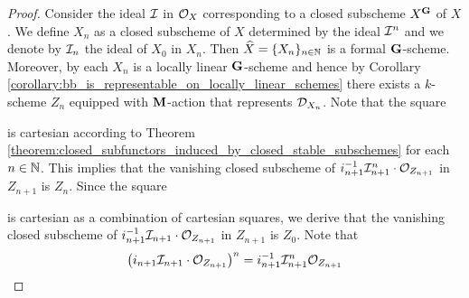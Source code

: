 \begin{proof}
Consider the ideal ${\mathcal I}$ in ${\mathcal O}_X$ corresponding to a closed subscheme $X^{\mathbf{G}}$ of $X$. We define $X_n$ as a closed subscheme of $X$ determined by the ideal ${\mathcal I}^n$ and we denote by ${\mathcal I}_{n}$ the ideal of $X_0$ in $X_n$. Then $\widehat{X} = \{X_n\}_{n\in {\mathbb N}}$ is a formal $\mathbf{G}$-scheme. Moreover, by {\cite[Corollary 5.1]{Algebraization}} each $X_n$ is a locally linear $\mathbf{G}$-scheme and hence by Corollary \ref{corollary:bb_is_representable_on_locally_linear_schemes} there exists a $k$-scheme $Z_n$ equipped with $\mathbf{M}$-action that represents ${\mathcal D}_{X_n}$. Note that the square
\begin{center}
\end{center}
is cartesian according to Theorem \ref{theorem:closed_subfunctors_induced_by_closed_stable_subschemes} for each $n\in {\mathbb N}$. This implies that the vanishing closed subscheme of $i_{n+1}^{-1}{\mathcal I}^n_{n+1}\cdot {\mathcal O}_{Z_{n+1}}$ in $Z_{n+1}$ is $Z_n$. Since the square
\begin{center}
\end{center}
is cartesian as a combination of cartesian squares, we derive that the vanishing closed subscheme of $i_{n+1}^{-1}{\mathcal I}_{n+1}\cdot {\mathcal O}_{Z_{n+1}}$ in $Z_{n+1}$ is $Z_0$. Note that $$\big(i_{n+1}{\mathcal I}_{n+1}\cdot {\mathcal O}_{Z_{n+1}}\big)^n = i_{n+1}^{-1}{\mathcal I}_{n+1}^n{\mathcal O}_{Z_{n+1}}$$

\end{proof}
